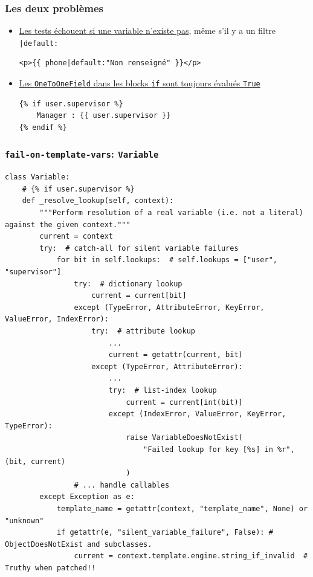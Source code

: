 \documentclass{beamer}
\begin{document}
\begin{frame}[fragile]
    \frametitle{Les deux problèmes}
    \begin{itemize}
        \item \href{https://github.com/pytest-dev/pytest-django/issues/471}{Les tests échouent si une variable n'existe pas}, même s'il y a un filtre \texttt{|default:}
\begin{verbatim}
<p>{{ phone|default:"Non renseigné" }}</p>
\end{verbatim}
        \item \href{https://github.com/pytest-dev/pytest-django/pull/1130}{Les \texttt{OneToOneField} dans les blocks \texttt{if} sont toujours évalués \texttt{True}}
\begin{verbatim}
{% if user.supervisor %}
    Manager : {{ user.supervisor }}
{% endif %}
\end{verbatim}
    \end{itemize}
\end{frame}

\begin{frame}[fragile]
    \frametitle{\texttt{fail-on-template-vars}: \texttt{Variable}}
    \vspace{-0.3cm}

    \begin{verbatim}
class Variable:
    # {% if user.supervisor %}
    def _resolve_lookup(self, context):
        """Perform resolution of a real variable (i.e. not a literal) against the given context."""
        current = context
        try:  # catch-all for silent variable failures
            for bit in self.lookups:  # self.lookups = ["user", "supervisor"]
                try:  # dictionary lookup
                    current = current[bit]
                except (TypeError, AttributeError, KeyError, ValueError, IndexError):
                    try:  # attribute lookup
                        ...
                        current = getattr(current, bit)
                    except (TypeError, AttributeError):
                        ...
                        try:  # list-index lookup
                            current = current[int(bit)]
                        except (IndexError, ValueError, KeyError, TypeError):
                            raise VariableDoesNotExist(
                                "Failed lookup for key [%s] in %r", (bit, current)
                            )
                # ... handle callables
        except Exception as e:
            template_name = getattr(context, "template_name", None) or "unknown"
            if getattr(e, "silent_variable_failure", False): # ObjectDoesNotExist and subclasses.
                current = context.template.engine.string_if_invalid  # Truthy when patched!!
    \end{verbatim}
\end{frame}
\end{document}
